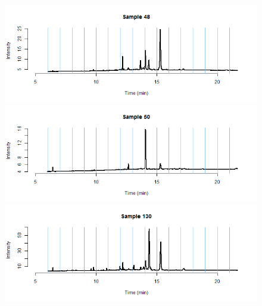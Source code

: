 \documentclass[11pt]{article}
\theoremstyle{plain}
\theoremstyle{definition}
\begin{document}
\begin{figure}[H]
\begin{center}
\includegraphics[trim ={3.5cm 2.7cm 2cm 2cm},scale=.6, clip=true]{BinPlotDMC_10.png}
\includegraphics[trim ={3.5cm 2.7cm 2cm 2cm},scale=.6, clip=true]{BinPlotDMC_11.png}
\includegraphics[trim ={3.5cm 2.7cm 2cm 2cm},scale=.6, clip=true]{BinPlotDMC_12.png}
\end{center}
\end{figure}
\end{document}
